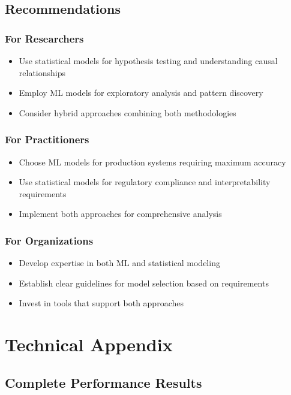 \documentclass[11pt,a4paper]{article}
\begin{document}
\subsection{Recommendations}

\subsubsection{For Researchers}
\begin{itemize}
\item Use statistical models for hypothesis testing and understanding causal relationships
\item Employ ML models for exploratory analysis and pattern discovery
\item Consider hybrid approaches combining both methodologies
\end{itemize}

\subsubsection{For Practitioners}
\begin{itemize}
\item Choose ML models for production systems requiring maximum accuracy
\item Use statistical models for regulatory compliance and interpretability requirements
\item Implement both approaches for comprehensive analysis
\end{itemize}

\subsubsection{For Organizations}
\begin{itemize}
\item Develop expertise in both ML and statistical modeling
\item Establish clear guidelines for model selection based on requirements
\item Invest in tools that support both approaches
\end{itemize}

\section{Technical Appendix}

\subsection{Complete Performance Results}
\end{document}
